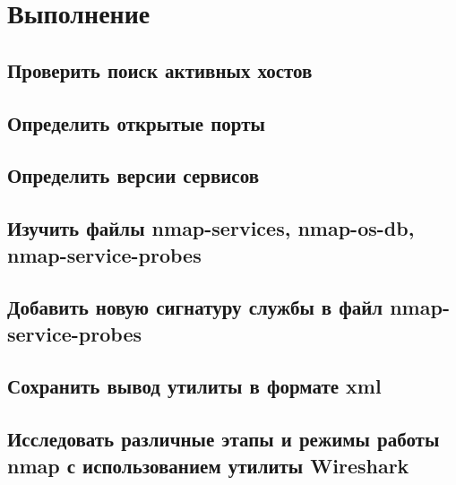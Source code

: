 \documentclass[utf8x, 12pt]{G7-32}
\begin{document}
\chapter{Выполнение}


\section{Проверить поиск активных хостов}



\section{Определить открытые порты}
\section{Определить версии сервисов}
\section{Изучить файлы nmap-services, nmap-os-db, nmap-service-probes}
\section{Добавить новую сигнатуру службы в файл nmap-service-probes}
\section{Сохранить вывод утилиты в формате xml}
\section{Исследовать различные этапы и режимы работы nmap с использованием утилиты Wireshark}


\begin{figure}[hhh!]
	\begin{center}
	\end{center}
\end{figure}	
\end{document}
